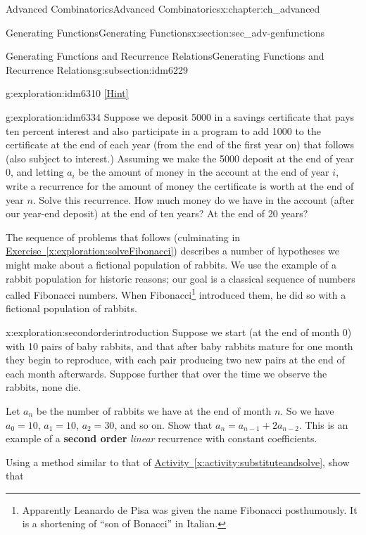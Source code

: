 \documentclass[oneside,10pt,]{book}
\newcommand{\terminology}[1]{\textbf{#1}}
\numberwithin{equation}{chapter}
\begin{document}
\begin{chapterptx}{Advanced Combinatorics}{}{Advanced Combinatorics}{}{}{x:chapter:ch_advanced}
\begin{sectionptx}{Generating Functions}{}{Generating Functions}{}{}{x:section:sec_adv-genfunctions}
\begin{subsectionptx}{Generating Functions and Recurrence Relations}{}{Generating Functions and Recurrence Relations}{}{}{g:subsection:idm6229}
\begin{exploration}{}{g:exploration:idm6310}
\space\hspace*{0pt}\hfill{\tiny\hyperlink{g:hint:idm6315-back}{[Hint]}}\end{exploration}
\begin{exploration}{}{g:exploration:idm6334}%
Suppose we deposit \textdollar{}5000 in a savings certificate that pays ten percent interest and also participate in a program to add \textdollar{}1000 to the certificate at the end of each year (from the end of the first year on) that follows (also subject to interest.) Assuming we make the \textdollar{}5000 deposit at the end of year 0, and letting \(a_i\) be the amount of money in the account at the end of year \(i\), write a recurrence for the amount of money the certificate is worth at the end of year \(n\). Solve this recurrence. How much money do we have in the account (after our year-end deposit) at the end of ten years?  At the end of 20 years?%
\end{exploration}
The sequence of problems that follows (culminating in \hyperref[x:exploration:solveFibonacci]{Exercise~\ref{x:exploration:solveFibonacci}}) describes a number of hypotheses we might make about a fictional population of rabbits. We use the example of a rabbit population for historic reasons; our goal is a classical sequence of numbers called Fibonacci numbers. When Fibonacci\footnote{Apparently Leanardo de Pisa was given the name Fibonacci posthumously. It is a shortening of ``son of Bonacci'' in Italian.\label{g:fn:idm6354}} introduced them, he did so with a fictional population of rabbits.%
\begin{exploration}{}{x:exploration:secondorderintroduction}%
Suppose we start (at the end of month 0) with 10 pairs of baby rabbits, and that after baby rabbits mature for one month they begin to reproduce, with each pair producing two new pairs at the end of each month afterwards. Suppose further that over the time we observe the rabbits, none die.%
\par
Let \(a_n\) be the number of rabbits we have at the end of month \(n\). So we have \(a_0 = 10\), \(a_1 = 10\), \(a_2 = 30\), and so on.  Show that \(a_n=a_{n-1} + 2a_{n-2}\). This is an example of a \terminology{second order} \emph{linear} recurrence with constant coefficients.%
\par
Using a method similar to that of \hyperref[x:activity:substituteandsolve]{Activity~\ref{x:activity:substituteandsolve}}, show that%

\end{exploration}
\end{subsectionptx}
\end{sectionptx}
\end{chapterptx}
\end{document}
